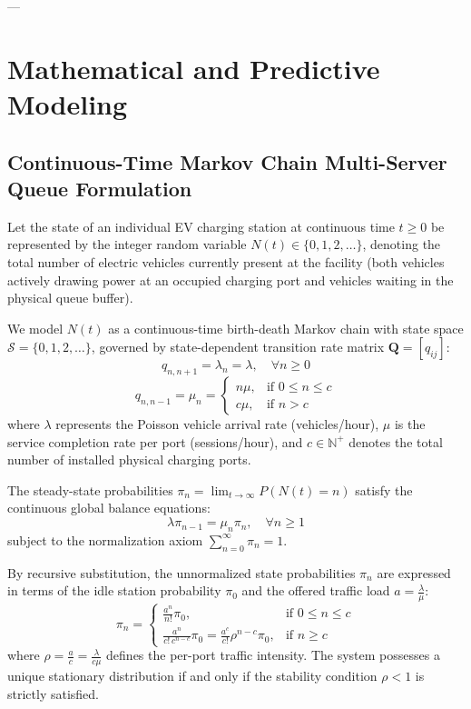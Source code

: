 \documentclass[preprint,12pt,authoryear]{elsarticle}
\begin{document}
---

\section{Mathematical and Predictive Modeling}
\label{sec:math}

\subsection{Continuous-Time Markov Chain Multi-Server Queue Formulation}
Let the state of an individual EV charging station at continuous time $t \ge 0$ be represented by the integer random variable $N(t) \in \{0, 1, 2, \dots\}$, denoting the total number of electric vehicles currently present at the facility (both vehicles actively drawing power at an occupied charging port and vehicles waiting in the physical queue buffer).

We model $N(t)$ as a continuous-time birth-death Markov chain with state space $\mathcal{S} = \{0, 1, 2, \dots\}$, governed by state-dependent transition rate matrix $\mathbf{Q} = [q_{ij}]$:
\begin{equation}
q_{n, n+1} = \lambda_n = \lambda, \quad \forall n \ge 0
\end{equation}
\begin{equation}
q_{n, n-1} = \mu_n = 
\begin{cases} 
n\mu, & \text{if } 0 \le n \le c \\ 
c\mu, & \text{if } n > c 
\end{cases}
\end{equation}
where $\lambda$ represents the Poisson vehicle arrival rate (vehicles/hour), $\mu$ is the service completion rate per port (sessions/hour), and $c \in \mathbb{N}^+$ denotes the total number of installed physical charging ports.

\begin{definition}
The steady-state probabilities $\pi_n = \lim_{t \to \infty} P(N(t) = n)$ satisfy the continuous global balance equations:
\begin{equation}
\lambda \pi_{n-1} = \mu_n \pi_n, \quad \forall n \ge 1
\end{equation}
subject to the normalization axiom $\sum_{n=0}^{\infty} \pi_n = 1$.
\end{definition}

By recursive substitution, the unnormalized state probabilities $\pi_n$ are expressed in terms of the idle station probability $\pi_0$ and the offered traffic load $a = \frac{\lambda}{\mu}$:
\begin{equation}
\pi_n = 
\begin{cases}
\frac{a^n}{n!} \pi_0, & \text{if } 0 \le n \le c \\
\frac{a^n}{c! \, c^{n-c}} \pi_0 = \frac{a^c}{c!} \rho^{n-c} \pi_0, & \text{if } n \ge c
\end{cases}
\end{equation}
where $\rho = \frac{a}{c} = \frac{\lambda}{c\mu}$ defines the per-port traffic intensity. The system possesses a unique stationary distribution if and only if the stability condition $\rho < 1$ is strictly satisfied.
\end{document}

